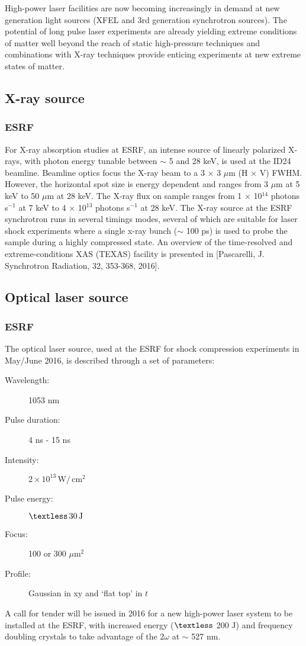 \documentclass[a4paper]{article}
\begin{document}
High-power laser facilities are now becoming increasingly in demand at new generation light sources (XFEL and 3rd generation synchrotron sources). The potential of long pulse laser experiments are already yielding extreme conditions of matter well beyond the reach of static high-pressure techniques and combinations with X-ray techniques provide enticing experiments at new extreme states of matter.

\subsection{X-ray source}
\subsubsection{ESRF}
For X-ray absorption studies at ESRF, an intense source of linearly polarized X-rays, with photon energy tunable between $\sim$ 5 and 28 keV, is used at the ID24 beamline. Beamline optics focus the X-ray beam to a 3 $\times$ 3 $\mu$m (H $\times$ V) FWHM. However, the horizontal spot size is energy dependent and ranges from 3 $\mu$m at 5 keV to 50 $\mu$m at 28 keV. The X-ray flux on sample ranges from 1 $\times$ 10$^{14}$ photons s$^{-1}$ at 7 keV to 4 $\times$ 10$^{13}$ photons s$^{-1}$ at 28 keV. The X-ray source at the ESRF synchrotron runs in several timings modes, several of which are suitable for laser shock experiments where a single x-ray bunch ($\sim$ 100 ps) is used to probe the sample during a highly compressed state. An overview of the time-resolved and extreme-conditions XAS (TEXAS) facility is presented in [Pascarelli, J. Synchrotron Radiation, 32, 353-368, 2016].
\subsection{Optical laser source}
\subsubsection{ESRF}
The optical laser source, used at the ESRF for shock compression experiments in May/June 2016,  is described through a set of parameters:
\begin{description}
  \item[Wavelength:] 1053 nm
  \item[Pulse duration:] 4 ns - 15 ns
  \item[Intensity:] $2\times 10^{13}\,\text{W}/\,\text{cm}^2$
  \item[Pulse energy:] $\textless \, 30\, \text{J}$
  \item[Focus:] 100 or 300 $\mu\text{m}^{2}$
  \item[Profile:] Gaussian in xy and `flat top' in $t$
\end{description}
A call for tender will be issued in 2016 for a new high-power laser system to be installed at the ESRF, with increased energy ($\textless$ 200 J) and frequency doubling crystals to take advantage of the 2$\omega$ at $\sim$ 527 nm.
\end{document}
